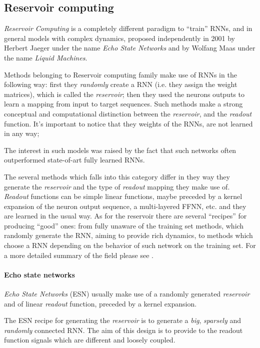 \subsection{Reservoir computing} 
\label{sec:reservoir}

\textit{Reservoir Computing} is a completely different paradigm to ``train'' RNNs, and in general models with complex 
dynamics, proposed independently in 2001 by Herbert Jaeger under the name \textit{Echo State 
Networks}\cite{echoStateNetworks} and by Wolfang Maas under the name \textit{Liquid Machines}\cite{liquidStateMachines}.

Methods belonging to Reservoir computing family make use of RNNs in the following way: first they \textit{randomly} 
create a RNN (i.e. they assign the weight matrices), which is called the \textit{reservoir}; then they used the neurons
outputs to learn a mapping from input to target sequences.
Such methods make a strong conceptual and computational distinction between the \textit{reservoir}, and the 
\textit{readout} function.
It's important to notice that they weights of the RNNs, are not learned in any way;

The interest in such models was raised by the fact that such networks often outperformed state-of-art fully learned 
RNNs.


The several methods which falls into this category differ in they way they generate the \textit{reservoir} and the type 
of \textit{readout} mapping they make use of. \textit{Readout} functions can be simple linear functions, maybe preceded 
by a kernel expansion of the neuron output sequence, a multi-layered FFNN, etc. and they are learned in the usual way.
As for the reservoir there are several ``recipes'' for producing ``good'' ones: from fully unaware of the training set 
methods, which randomly generate the RNN, aiming to provide rich dynamics, to methods which choose a RNN depending on 
the behavior of such network on the training set.
For a more detailed summary of the field please see \cite{reservoirSummary}.


\paragraph{Echo state networks}

\textit{Echo State Networks} (ESN) usually make use of a randomly generated \textit{reservoir} and of linear 
\textit{readout} function, preceded by a kernel expansion.

The ESN recipe for generating the \textit{reservoir} is to generate a \textit{big}, \textit{sparsely} and 
\textit{randomly} connected RNN. The aim of this design is to provide to the readout function signals which are 
different and loosely coupled.

